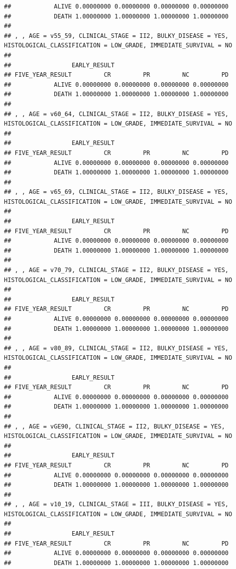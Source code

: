 \documentclass[]{article}
\begin{document}
\begin{verbatim}
##            ALIVE 0.00000000 0.00000000 0.00000000 0.00000000
##            DEATH 1.00000000 1.00000000 1.00000000 1.00000000
## 
## , , AGE = v55_59, CLINICAL_STAGE = II2, BULKY_DISEASE = YES, HISTOLOGICAL_CLASSIFICATION = LOW_GRADE, IMMEDIATE_SURVIVAL = NO
## 
##                 EARLY_RESULT
## FIVE_YEAR_RESULT         CR         PR         NC         PD
##            ALIVE 0.00000000 0.00000000 0.00000000 0.00000000
##            DEATH 1.00000000 1.00000000 1.00000000 1.00000000
## 
## , , AGE = v60_64, CLINICAL_STAGE = II2, BULKY_DISEASE = YES, HISTOLOGICAL_CLASSIFICATION = LOW_GRADE, IMMEDIATE_SURVIVAL = NO
## 
##                 EARLY_RESULT
## FIVE_YEAR_RESULT         CR         PR         NC         PD
##            ALIVE 0.00000000 0.00000000 0.00000000 0.00000000
##            DEATH 1.00000000 1.00000000 1.00000000 1.00000000
## 
## , , AGE = v65_69, CLINICAL_STAGE = II2, BULKY_DISEASE = YES, HISTOLOGICAL_CLASSIFICATION = LOW_GRADE, IMMEDIATE_SURVIVAL = NO
## 
##                 EARLY_RESULT
## FIVE_YEAR_RESULT         CR         PR         NC         PD
##            ALIVE 0.00000000 0.00000000 0.00000000 0.00000000
##            DEATH 1.00000000 1.00000000 1.00000000 1.00000000
## 
## , , AGE = v70_79, CLINICAL_STAGE = II2, BULKY_DISEASE = YES, HISTOLOGICAL_CLASSIFICATION = LOW_GRADE, IMMEDIATE_SURVIVAL = NO
## 
##                 EARLY_RESULT
## FIVE_YEAR_RESULT         CR         PR         NC         PD
##            ALIVE 0.00000000 0.00000000 0.00000000 0.00000000
##            DEATH 1.00000000 1.00000000 1.00000000 1.00000000
## 
## , , AGE = v80_89, CLINICAL_STAGE = II2, BULKY_DISEASE = YES, HISTOLOGICAL_CLASSIFICATION = LOW_GRADE, IMMEDIATE_SURVIVAL = NO
## 
##                 EARLY_RESULT
## FIVE_YEAR_RESULT         CR         PR         NC         PD
##            ALIVE 0.00000000 0.00000000 0.00000000 0.00000000
##            DEATH 1.00000000 1.00000000 1.00000000 1.00000000
## 
## , , AGE = vGE90, CLINICAL_STAGE = II2, BULKY_DISEASE = YES, HISTOLOGICAL_CLASSIFICATION = LOW_GRADE, IMMEDIATE_SURVIVAL = NO
## 
##                 EARLY_RESULT
## FIVE_YEAR_RESULT         CR         PR         NC         PD
##            ALIVE 0.00000000 0.00000000 0.00000000 0.00000000
##            DEATH 1.00000000 1.00000000 1.00000000 1.00000000
## 
## , , AGE = v10_19, CLINICAL_STAGE = III, BULKY_DISEASE = YES, HISTOLOGICAL_CLASSIFICATION = LOW_GRADE, IMMEDIATE_SURVIVAL = NO
## 
##                 EARLY_RESULT
## FIVE_YEAR_RESULT         CR         PR         NC         PD
##            ALIVE 0.00000000 0.00000000 0.00000000 0.00000000
##            DEATH 1.00000000 1.00000000 1.00000000 1.00000000

\end{verbatim}
\end{document}
